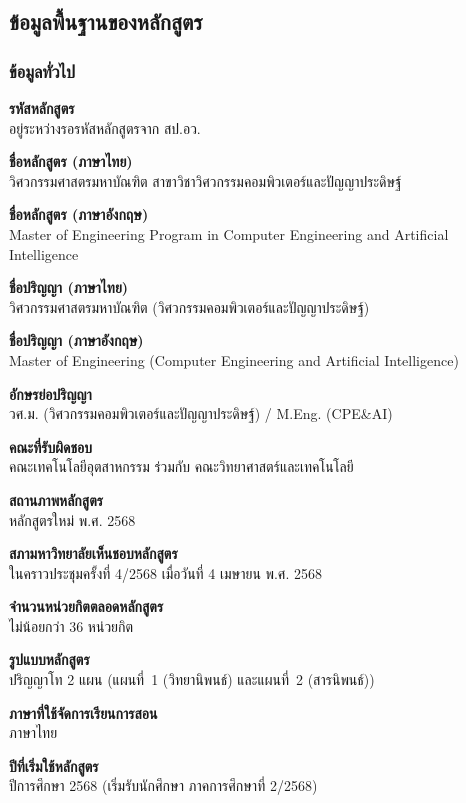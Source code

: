 \subsection{ข้อมูลพื้นฐานของหลักสูตร}

\subsubsection*{ข้อมูลทั่วไป}

\textbf{รหัสหลักสูตร}\\
อยู่ระหว่างรอรหัสหลักสูตรจาก สป.อว.

\textbf{ชื่อหลักสูตร (ภาษาไทย)}\\
วิศวกรรมศาสตรมหาบัณฑิต สาขาวิชาวิศวกรรมคอมพิวเตอร์และปัญญาประดิษฐ์

\textbf{ชื่อหลักสูตร (ภาษาอังกฤษ)}\\
Master of Engineering Program in Computer Engineering and Artificial Intelligence

\textbf{ชื่อปริญญา (ภาษาไทย)}\\
วิศวกรรมศาสตรมหาบัณฑิต (วิศวกรรมคอมพิวเตอร์และปัญญาประดิษฐ์)

\textbf{ชื่อปริญญา (ภาษาอังกฤษ)}\\
Master of Engineering (Computer Engineering and Artificial Intelligence)

\textbf{อักษรย่อปริญญา}\\
วศ.ม. (วิศวกรรมคอมพิวเตอร์และปัญญาประดิษฐ์) / M.Eng. (CPE\&AI)

\textbf{คณะที่รับผิดชอบ}\\
คณะเทคโนโลยีอุตสาหกรรม ร่วมกับ คณะวิทยาศาสตร์และเทคโนโลยี

\textbf{สถานภาพหลักสูตร}\\
หลักสูตรใหม่ พ.ศ. 2568

\textbf{สภามหาวิทยาลัยเห็นชอบหลักสูตร}\\
ในคราวประชุมครั้งที่ 4/2568 เมื่อวันที่ 4 เมษายน พ.ศ. 2568

\textbf{จำนวนหน่วยกิตตลอดหลักสูตร}\\
ไม่น้อยกว่า 36 หน่วยกิต

\textbf{รูปแบบหลักสูตร}\\
ปริญญาโท 2 แผน (แผนที่~1 (วิทยานิพนธ์) และแผนที่~2 (สารนิพนธ์))

\textbf{ภาษาที่ใช้จัดการเรียนการสอน}\\
ภาษาไทย

\textbf{ปีที่เริ่มใช้หลักสูตร}\\
ปีการศึกษา 2568 (เริ่มรับนักศึกษา ภาคการศึกษาที่ 2/2568)

